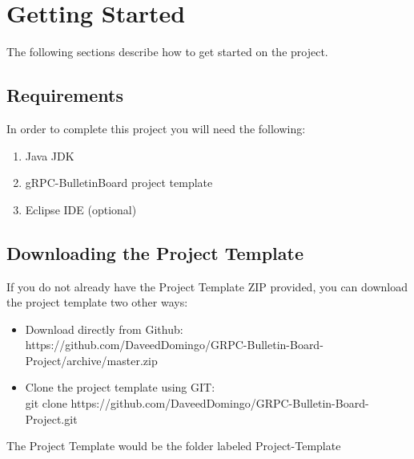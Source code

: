 \documentclass{article}
\begin{document}
\section{Getting Started} %
The following sections describe how to get started on the project. 

\subsection{Requirements}
In order to complete this project you will need the following:
\begin{enumerate}
\item Java JDK
\item gRPC-BulletinBoard project template
\item Eclipse IDE (optional)
\end{enumerate}

\subsection{Downloading the Project Template}
If you do not already have the Project Template ZIP provided, you can download the project template two other ways:
\begin{itemize}
\item Download directly from Github:\\ https://github.com/DaveedDomingo/GRPC-Bulletin-Board-Project/archive/master.zip
\item Clone the project template using GIT:\\ git clone https://github.com/DaveedDomingo/GRPC-Bulletin-Board-Project.git
\end{itemize} 
The Project Template would be the folder labeled Project-Template
\end{document}
